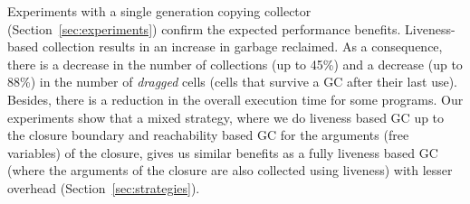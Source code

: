 \documentclass[9pt]{sigplanconf}
\begin{document}
Experiments    with   a    single    generation   copying    collector
(Section~\ref{sec:experiments})   confirm  the   expected  performance
benefits.  Liveness-based collection results in an increase in garbage
reclaimed.  As  a consequence, there  is a  decrease in the  number of
collections (up to 45\%) and a decrease  (up to 88\%) in the number of
{\em  dragged}  cells  (cells  that  survive a  GC  after  their  last
use). Besides, there is a reduction  in the overall execution time for
some programs.  Our  experiments show that a mixed  strategy, where we
do liveness based GC up to the closure boundary and reachability based
GC for the arguments (free variables) of the closure, gives us similar
benefits as  a fully  liveness based  GC (where  the arguments  of the
closure  are  also  collected  using liveness)  with  lesser  overhead
(Section~\ref{sec:strategies}).


\end{document}
